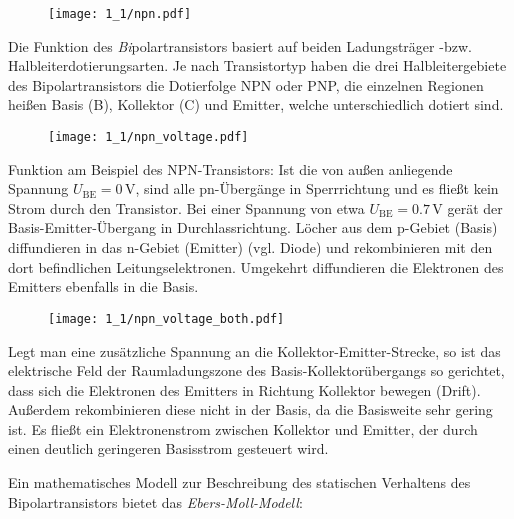 \begin{figure}[H]
\begin{center}
  \texttt{[image: 1\_1/npn.pdf]}
  \end{center}
\end{figure}

Die Funktion des \emph{Bi}polartransistors basiert auf beiden Ladungsträger
-bzw. Halbleiterdotierungsarten. Je nach Transistortyp haben die drei Halbleitergebiete des Bipolartransistors die Dotierfolge NPN oder PNP, die einzelnen Regionen heißen Basis (B), Kollektor (C) und Emitter, welche unterschiedlich dotiert sind.\\

\begin{figure}[H]
\begin{center}
  \texttt{[image: 1\_1/npn\_voltage.pdf]}
  \end{center}
\end{figure}
Funktion am Beispiel des NPN-Transistors:
Ist die von außen anliegende Spannung $U_{\textrm{BE}}= 0\, \si{\volt}$, sind alle pn-Übergänge in Sperrrichtung und es fließt kein Strom durch den Transistor. Bei einer Spannung von etwa $U_{\textrm{BE}}=0.7\,\si{\volt}$ gerät der Basis-Emitter-Übergang in Durchlassrichtung. Löcher aus dem p-Gebiet (Basis) diffundieren in das n-Gebiet (Emitter) (vgl. Diode) und rekombinieren mit den dort befindlichen Leitungselektronen. Umgekehrt diffundieren die Elektronen des Emitters ebenfalls in die Basis. \\

\begin{figure}[H]
\begin{center}
  \texttt{[image: 1\_1/npn\_voltage\_both.pdf]}
  \end{center}
\end{figure}
Legt man eine zusätzliche Spannung an die Kollektor-Emitter-Strecke, so ist das elektrische Feld der Raumladungszone des Basis-Kollektorübergangs so gerichtet, dass sich die Elektronen des Emitters in Richtung Kollektor bewegen (Drift). Außerdem rekombinieren diese nicht in der Basis, da die Basisweite sehr gering ist. Es fließt ein Elektronenstrom zwischen Kollektor und Emitter, der durch einen deutlich geringeren Basisstrom gesteuert wird.


Ein mathematisches Modell zur Beschreibung des statischen Verhaltens des Bipolartransistors bietet das \emph{Ebers-Moll-Modell}:

